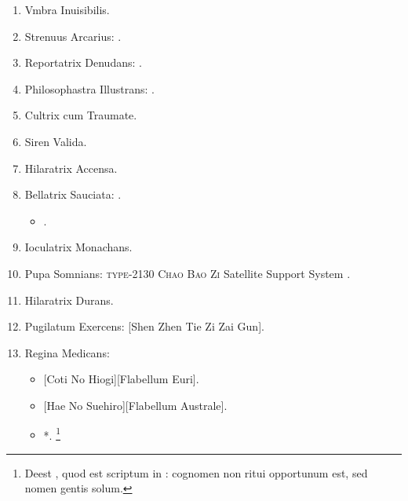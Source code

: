 \documentclass[12pt]{book}
\newcommand{\reconst}{*}
\begin{document}
\begin{enumerate}
  \renewcommand\labelenumi{\Roman{enumi}.}

  \item Vmbra Inuisibilis.
  \item Strenuus Arcarius: .
  \item Reportatrix Denudans: .
  \item Philosophastra Illustrans: .
  \item Cultrix cum Traumate.
  \item Siren Valida.
  \item Hilaratrix Accensa.
  \item Bellatrix Sauciata: .

        \begin{itemize}
          \item {}.
        \end{itemize}

  \item Ioculatrix Monachans.
  \item Pupa Somnians: \textsc{type-2130 Chao Bao Zi} Satellite Support System .
  \item Hilaratrix Durans.
  \item Pugilatum Exercens: [Shen Zhen Tie Zi Zai Gun].
  \item Regina Medicans:

        \begin{itemize}
          \item {}[Coti No Hiogi][Flabellum Euri].
          \item {}[Hae No Suehiro][Flabellum Australe].
          \item \reconst{}.%
                \footnote{%
                  Deest , quod est scriptum in : cognomen non ritui opportunum est, sed nomen gentis solum.
                }
        \end{itemize}


\end{enumerate}
\end{document}
